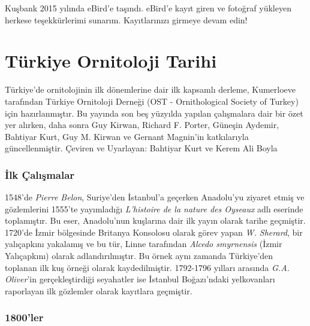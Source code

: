 \documentclass[
  a4paper,
  DIV=11,
  numbers=noendperiod]{scrreprt}
\begin{document}
Kuşbank 2015 yılında eBird'e taşındı. eBird'e kayıt giren ve fotoğraf
yükleyen herkese teşekkürlerimi sunarım. Kayıtlarınızı girmeye devam
edin!


\chapter*{Türkiye Ornitoloji Tarihi}\label{tuxfcrkiye-ornitoloji-tarihi}


Türkiye'de ornitolojinin ilk dönemlerine dair ilk kapsamlı derleme,
Kumerloeve tarafından Türkiye Ornitoloji Derneği (OST - Ornithological
Society of Turkey) için hazırlanmıştır. Bu yayında son beş yüzyılda
yapılan çalışmalara dair bir özet yer alırken, daha sonra Guy Kirwan,
Richard F. Porter, Güneşin Aydemir, Bahtiyar Kurt, Guy M. Kirwan ve
Gernant Magnin'in katkılarıyla güncellenmiştir. Çeviren ve Uyarlayan:
Bahtiyar Kurt ve Kerem Ali Boyla

\subsection*{İlk Çalışmalar}\label{ilk-uxe7alux131ux15fmalar}

1548'de \emph{Pierre Belon}, Suriye'den İstanbul'a geçerken Anadolu'yu
ziyaret etmiş ve gözlemlerini 1555'te yayımladığı \emph{L'histoire de la
nature des Oyseaux} adlı eserinde toplamıştır. Bu eser, Anadolu'nun
kuşlarına dair ilk yayın olarak tarihe geçmiştir. 1720'de İzmir
bölgesinde Britanya Konsolosu olarak görev yapan \emph{W. Sherard}, bir
yalıçapkını yakalamış ve bu tür, Linne tarafından \emph{Alcedo
smyrnensis} (İzmir Yalıçapkını) olarak adlandırılmıştır. Bu örnek aynı
zamanda Türkiye'den toplanan ilk kuş örneği olarak kaydedilmiştir.
1792-1796 yılları arasında \emph{G.A. Oliver}'in gerçekleştirdiği
seyahatler ise İstanbul Boğazı'ndaki yelkovanları raporlayan ilk
gözlemler olarak kayıtlara geçmiştir.

\subsection*{1800'ler}\label{ler}
\end{document}

